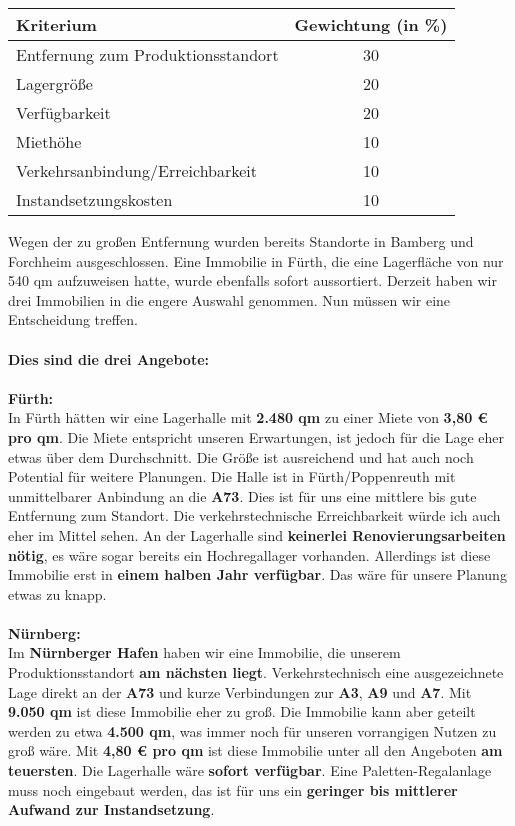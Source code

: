\begin{table}[h!]
\centering
\begin{tabular}{l|c}
\textbf{Kriterium} & \textbf{Gewichtung (in \%)} \\
\hline
Entfernung zum Produktionsstandort & 30 \\
Lagergröße & 20 \\
Verfügbarkeit & 20 \\
Miethöhe & 10 \\
Verkehrsanbindung/Erreichbarkeit & 10 \\
Instandsetzungskosten & 10 \\
\end{tabular}
\end{table}
\noindent
Wegen der zu großen Entfernung wurden bereits Standorte in Bamberg und Forchheim ausgeschlossen. Eine Immobilie in Fürth, die eine Lagerfläche von nur 540 qm aufzuweisen hatte, wurde ebenfalls sofort aussortiert. Derzeit haben wir drei Immobilien in die engere Auswahl genommen. Nun müssen wir eine Entscheidung treffen.
\\~\\
\textbf{Dies sind die drei Angebote:}
\\~\\
\textbf{Fürth:}\\
In Fürth hätten wir eine Lagerhalle mit \textbf{2.480 qm} zu einer Miete von \textbf{3,80 € pro qm}. Die Miete entspricht unseren Erwartungen, ist jedoch für die Lage eher etwas über dem Durchschnitt. Die Größe ist ausreichend und hat auch noch Potential für weitere Planungen. Die Halle ist in Fürth/Poppenreuth mit unmittelbarer Anbindung an die \textbf{A73}. Dies ist für uns eine mittlere bis gute Entfernung zum Standort. Die verkehrstechnische Erreichbarkeit würde ich auch eher im Mittel sehen. An der Lagerhalle sind \textbf{keinerlei Renovierungsarbeiten nötig}, es wäre sogar bereits ein Hochregallager vorhanden. Allerdings ist diese Immobilie erst in \textbf{einem halben Jahr verfügbar}. Das wäre für unsere Planung etwas zu knapp.
\\~\\
\textbf{Nürnberg:}\\
Im \textbf{Nürnberger Hafen} haben wir eine Immobilie, die unserem Produktionsstandort \textbf{am nächsten liegt}. Verkehrstechnisch eine ausgezeichnete Lage direkt an der \textbf{A73} und kurze Verbindungen zur \textbf{A3}, \textbf{A9} und \textbf{A7}. Mit \textbf{9.050 qm} ist diese Immobilie eher zu groß. Die Immobilie kann aber geteilt werden zu etwa \textbf{4.500 qm}, was immer noch für unseren vorrangigen Nutzen zu groß wäre. Mit \textbf{4,80 € pro qm} ist diese Immobilie unter all den Angeboten \textbf{am teuersten}. Die Lagerhalle wäre \textbf{sofort verfügbar}. Eine Paletten-Regalanlage muss noch eingebaut werden, das ist für uns ein \textbf{geringer bis mittlerer Aufwand zur Instandsetzung}.
